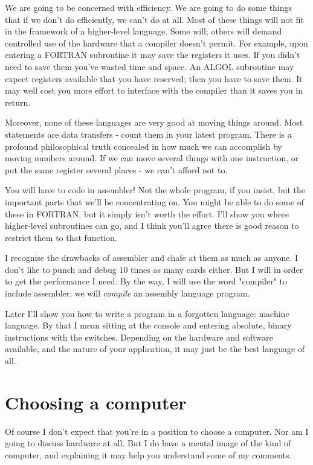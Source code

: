 \documentclass[b5paper, oneside]{book}
\begin{document}
We are going to be concerned with efficiency. We are going to do some things that if we don't do efficiently, we can't do at all. Most of these things will not fit in the framework of a higher-level language. Some will; others will demand controlled use of the hardware that a compiler doesn't permit. For example, upon entering a FORTRAN subroutine it may save the registers it uses. If you didn't need to save them you've wasted time and space. An ALGOL subroutine may expect registers available that you have reserved; then you have to save them. It may well cost you more effort to interface with the compiler than it saves you in return.

Moreover, none of these languages are very good at moving things around. Most statements are data transfers - count them in your latest program. There is a profound philosophical truth concealed in how much we can accomplish by moving numbers around. If we can move several things with one instruction, or put the same register several places - we can't afford not to.

You will have to code in assembler! Not the whole program, if you insist, but the important parts that we'll be concentrating on. You might be able to do some of these in FORTRAN, but it simply isn't worth the effort. I'll show you where higher-level subroutines can go, and I think you'll agree there is good reason to restrict them to that function.

I recognise the drawbacks of assembler and chafe at them as much as anyone. I don't like to punch and debug 10 times as many cards either. But I will in order to get the performance I need. By the way, I will use the word "compiler" to include assembler; we will {\em compile} an assembly language program.

Later I'll show you how to write a program in a forgotten language: machine language. By that I mean sitting at the console and entering absolute, binary instructions with the switches. Depending on the hardware and software available, and the nature of your application, it may just be the best language of all.

\section{Choosing a computer}
Of course I don't expect that you're in a position to choose a computer. Nor am I going to discuss hardware at all. But I do have a mental image of the kind of computer, and explaining it may help you understand some of my comments.
\end{document}

